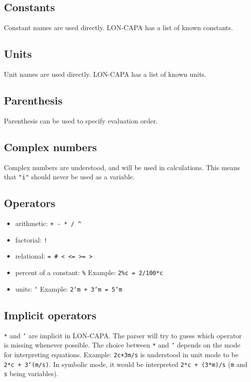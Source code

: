 \subsection{Constants}
Constant names are used directly. LON-CAPA has a list of known constants.

\subsection{Units}
Unit names are used directly. LON-CAPA has a list of known units.

\subsection{Parenthesis}
Parenthesis can be used to specify evaluation order.

\subsection{Complex numbers}
Complex numbers are understood, and will be used in calculations.
This means that \texttt{"i"} should never be used as a variable.

\subsection{Operators}
\begin{itemize}
\item arithmetic: \texttt{+ - * / \^}
\item factorial: \texttt{!}
\item relational: \texttt{= \# < <= >= >}
\item percent of a constant: \texttt{\%}
Example: \texttt{2\%c = 2/100*c}
\item units: \texttt{`}
Example: \texttt{2`m + 3`m = 5`m}
\end{itemize}

\subsection{Implicit operators}
\texttt{*} and \texttt{`} are implicit in LON-CAPA.
The parser will try to guess which operator is missing whenever possible.
The choice between \texttt{*} and \texttt{`} depends on the mode for interpreting equations.
Example: \texttt{2c+3m/s} is understood in unit mode to be \texttt{2*c + 3`(m/s)}.
In symbolic mode, it would be interpreted \texttt{2*c + (3*m)/s} (\texttt{m} and \texttt{s} being variables).

